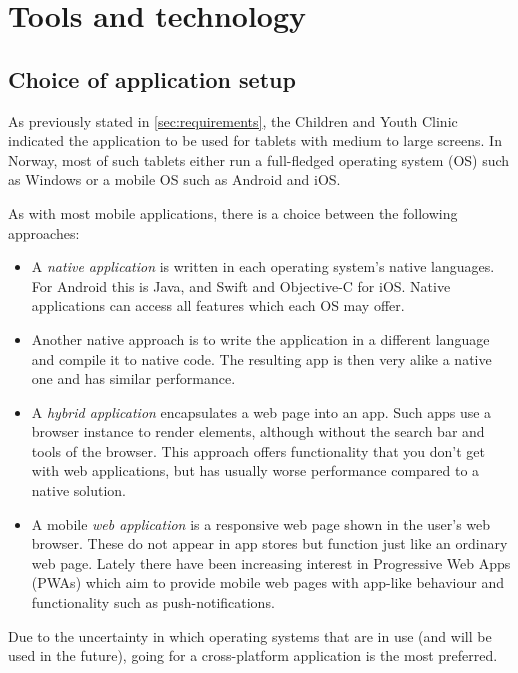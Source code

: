 \chapter{Tools and technology}
\label{ch:tools}

\section{Choice of application setup}


As previously stated in \autoref{sec:requirements}, the Children and Youth Clinic indicated the application to be used for tablets with medium to large screens. In Norway, most of such tablets either run a full-fledged operating system (OS) such as Windows or a mobile OS such as Android and iOS. 

As with most mobile applications, there is a choice between the following approaches:

\begin{itemize}
    \item A \emph{native application} is written in each operating system's native languages. For Android this is Java, and Swift and Objective-C for iOS. Native applications can access all features which each OS may offer.
    \item Another native approach is to write the application in a different language and compile it to native code. The resulting app is then very alike a native one and has similar performance.
    \item A \emph{hybrid application} encapsulates a web page into an app. Such apps use a browser instance to render elements, although without the search bar and tools of the browser. This approach offers functionality that you don't get with web applications, but has usually worse performance compared to a native solution.
    \item A mobile \emph{web application} is a responsive web page shown in the user's web browser. These do not appear in app stores but function just like an ordinary web page. Lately there have been increasing interest in Progressive Web Apps (PWAs) which aim to provide mobile web pages with app-like behaviour and functionality such as push-notifications.
\end{itemize}

Due to the uncertainty in which operating systems that are in use (and will be used in the future), going for a cross-platform application is the most preferred. 

